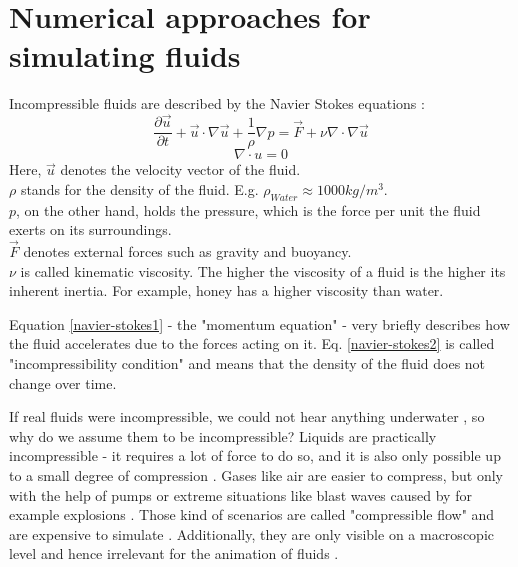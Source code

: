 \chapter{Numerical approaches for simulating fluids}\label{chapter:cudapressuresolver}

Incompressible fluids are described by the Navier Stokes equations \parencite{navier1827memoire} \parencite{stokes1880theories}:\\
\begin{equation} \label{navier-stokes1}
    \frac{\partial \vec{u}}{\partial t} + \vec{u} \cdot \nabla \vec{u} + \frac{1}{\rho}  \nabla p = \vec{F} + \nu \nabla \cdot \nabla \vec{u}
\end{equation}
\begin{equation} \label{navier-stokes2}
    \nabla \cdot u = 0
\end{equation}
Here, $\vec{u}$ denotes the velocity vector of the fluid.\\
$\rho$ stands for the density of the fluid. E.g. $\rho_{Water} \approx 1000 kg/m^3$. \\
$p$, on the other hand, holds the pressure, which is the force per unit the fluid exerts on its surroundings.\\
$\vec{F}$ denotes external forces such as gravity and buoyancy.\\
$\nu$ is called kinematic viscosity. The higher the viscosity of a fluid is the higher its inherent inertia. For example, honey has a higher viscosity than water.\\
\par Equation \ref{navier-stokes1} - the "momentum equation" - very briefly describes how the fluid accelerates due to the forces acting on it. Eq. \ref{navier-stokes2} is called "incompressibility condition" and means that the density of the fluid does not change over time.
\par If real fluids were incompressible, we could not hear anything underwater \parencite{urick1967principles}, so why do we assume them to be incompressible? Liquids are practically incompressible - it requires a lot of force to do so, and it is also only possible up to a small degree of compression \parencite{kell1975density}. Gases like air are easier to compress, but only with the help of pumps \parencite{burenga1978portable} or extreme situations like blast waves caused by for example explosions \parencite{taylor1950formation} \parencite{taylor1950formation2}. Those kind of scenarios are called "compressible flow" and are expensive to simulate \parencite{poinsot1992boundary}. Additionally, they are only visible on a macroscopic level and hence irrelevant for the animation of fluids \parencite{bridson2015fluid}.
